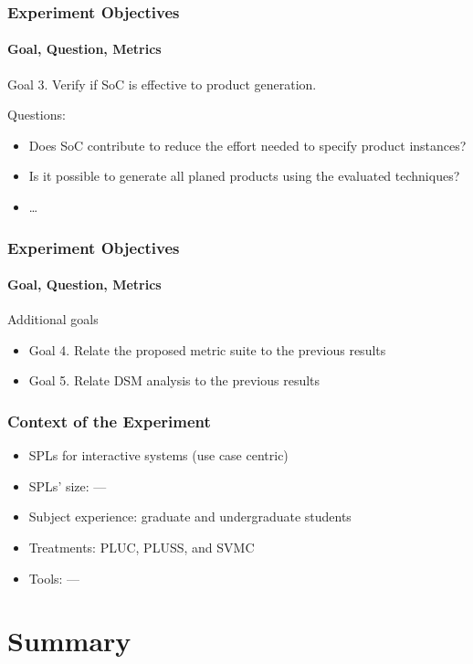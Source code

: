 \documentclass{beamer}
\begin{document}
\begin{frame}
\frametitle{Experiment Objectives}
\framesubtitle{Goal, Question, Metrics}

\begin{block}{Goal 3. Verify if SoC is effective to product generation.} 

Questions:
\small{
\begin{itemize}
  \item Does SoC contribute to reduce the effort needed to specify product
  instances?
  \item Is it possible to generate all planed products using the evaluated techniques?
  \item \ldots
\end{itemize}
}
\end{block}

\end{frame}

\begin{frame}
\frametitle{Experiment Objectives}
\framesubtitle{Goal, Question, Metrics}

\begin{block}{Additional goals}
\begin{itemize}
\item Goal 4. Relate the proposed metric suite to the previous results
\item Goal 5. Relate DSM analysis to the previous results
\end{itemize}
\end{block}

\end{frame}

 
\begin{frame}
\frametitle{Context of the Experiment}

\begin{itemize}
  \item SPLs for interactive systems (use case centric)
  \item SPLs' size: ---
  \item Subject experience: graduate and undergraduate students
  \item Treatments: PLUC, PLUSS, and SVMC
  \item Tools: ---    
\end{itemize}

\end{frame}



\section*{Summary}
\end{document}
